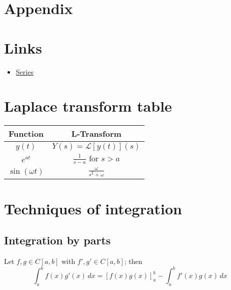 \documentclass[12pt, a4paper]{article}
\newcommand{\CL}{\mathcal{L}}
\begin{document}
\pagebreak

\appendix

\section*{Appendix}

\section{Links}

\begin{itemize}
    \item \href{https://tutorial.math.lamar.edu/Classes/DE/SeriesIntro.aspx}{Series}
\end{itemize}

\section{Laplace transform table}

\begin{table}[H]
    \begin{center}
        \begin{tabular}{|c|c|}
            \hline
            \textbf{Function} & \textbf{L-Transform} \\ \hline
            \(y(t)\) & \(Y(s) = \CL[y(t)](s)\) \\ \hline
            \(e^{at}\) & \(\frac{1}{s-a} \text{ for } s>a\) \\ \hline
            \(\sin(\omega t)\) & \(\frac{\omega}{s^2+\omega}\) 
        \end{tabular}
    \end{center}
\end{table}

\section{Techniques of integration}

\subsection{Integration by parts}

\begin{mdthm}
    Let \(f,g \in C[a,b]\) with \(f',g' \in C[a,b]\); then
    \[\int_a^b f(x)g'(x) \, dx =[f(x)g(x)]^b_a -\int_a^b f'(x)g(x)\, dx\]
\end{mdthm}
\end{document}

